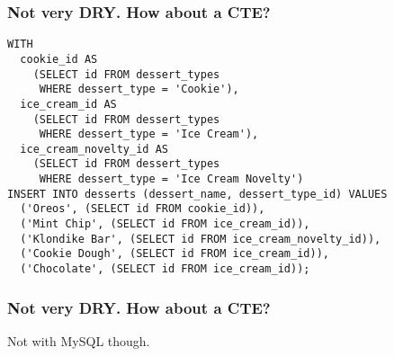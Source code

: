 \documentclass{beamer}
\begin{document}
\begin{frame}[fragile]
  \frametitle{Not very DRY. How about a CTE?}
  \begin{lstlisting}
WITH
  cookie_id AS
    (SELECT id FROM dessert_types
     WHERE dessert_type = 'Cookie'),
  ice_cream_id AS
    (SELECT id FROM dessert_types
     WHERE dessert_type = 'Ice Cream'),
  ice_cream_novelty_id AS
    (SELECT id FROM dessert_types
     WHERE dessert_type = 'Ice Cream Novelty')
INSERT INTO desserts (dessert_name, dessert_type_id) VALUES
  ('Oreos', (SELECT id FROM cookie_id)),
  ('Mint Chip', (SELECT id FROM ice_cream_id)),
  ('Klondike Bar', (SELECT id FROM ice_cream_novelty_id)),
  ('Cookie Dough', (SELECT id FROM ice_cream_id)),
  ('Chocolate', (SELECT id FROM ice_cream_id));

  \end{lstlisting}
\end{frame}

\begin{frame}[fragile]
  \frametitle{Not very DRY. How about a CTE?}
  Not with MySQL though.
\end{frame}
\end{document}
